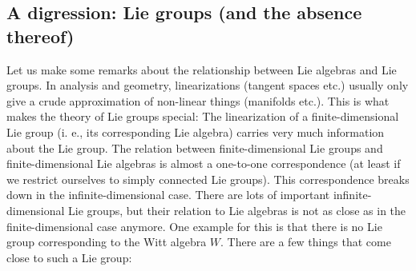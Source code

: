 \documentclass
[numbers=enddot,12pt,final,onecolumn,german,notitlepage]{scrartcl}%
\theoremstyle{definition}
\begin{document}
\subsection{A digression: Lie groups (and the absence thereof)}

Let us make some remarks about the relationship between Lie algebras and Lie
groups. In analysis and geometry, linearizations (tangent spaces etc.) usually
only give a crude approximation of non-linear things (manifolds etc.). This is
what makes the theory of Lie groups special: The linearization of a
finite-dimensional Lie group (i. e., its corresponding Lie algebra) carries
very much information about the Lie group. The relation between
finite-dimensional Lie groups and finite-dimensional Lie algebras is almost a
one-to-one correspondence (at least if we restrict ourselves to simply
connected Lie groups). This correspondence breaks down in the
infinite-dimensional case. There are lots of important infinite-dimensional
Lie groups, but their relation to Lie algebras is not as close as in the
finite-dimensional case anymore. One example for this is that there is no Lie
group corresponding to the Witt algebra $W$. There are a few things that come
close to such a Lie group:
\end{document}
